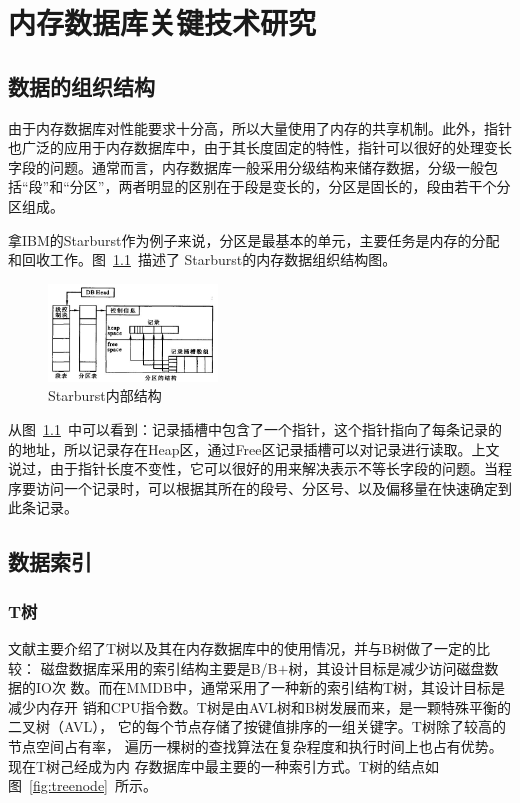 \documentclass[literaturereview]{zjutreport}
\begin{document}
\chapter{内存数据库关键技术研究}
\section{数据的组织结构}
由于内存数据库对性能要求十分高，所以大量使用了内存的共享机制。此外，指针也广泛的应用于内存数据库中，由于其长度固定的特性，指针可以很好的处理变长字段的问题。通常而言，内存数据库一般采用分级结构来储存数据，分级一般包括“段”和“分区”，两者明显的区别在于段是变长的，分区是固长的，段由若干个分区组成。

拿IBM的Starburst作为例子来说，分区是最基本的单元，主要任务是内存的分配和回收工作。图~\ref{fig:starburst}~描述了
Starburst的内存数据组织结构图。

\begin{figure}[htbp]
\centering
\includegraphics[width=0.4\textwidth]{starburst}
\caption{Starburst内部结构}\label{fig:starburst}
\vspace{\baselineskip}
\end{figure}

从图~\ref{fig:starburst}~中可以看到：记录插槽中包含了一个指针，这个指针指向了每条记录的的地址，所以记录存在Heap区，通过Free区记录插槽可以对记录进行读取。上文说过，由于指针长度不变性，它可以很好的用来解决表示不等长字段的问题。当程序要访问一个记录时，可以根据其所在的段号、分区号、以及偏移量在快速确定到此条记录。

\section{数据索引}
\subsection{T树}
文献\cite{wangshan2007}主要介绍了T树以及其在内存数据库中的使用情况，并与B树做了一定的比较：
磁盘数据库采用的索引结构主要是B/B$+$树，其设计目标是减少访问磁盘数据的IO次
数。而在MMDB中，通常采用了一种新的索引结构T树，其设计目标是减少内存开
销和CPU指令数。T树是由AVL树和B树发展而来，是一颗特殊平衡的二叉树（AVL），
它的每个节点存储了按键值排序的一组关键字。T树除了较高的节点空间占有率，
遍历一棵树的查找算法在复杂程度和执行时间上也占有优势。现在T树己经成为内
存数据库中最主要的一种索引方式。T树的结点如图~\ref{fig:treenode}~所示。
\end{document}
